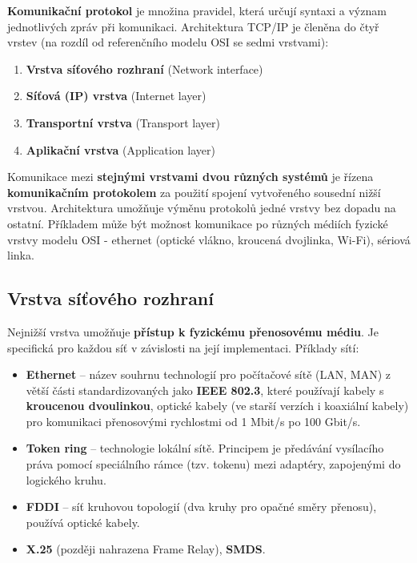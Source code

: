 \textbf{Komunikační protokol} je množina pravidel, která určují syntaxi a význam jednotlivých zpráv při komunikaci. Architektura TCP/IP je členěna do čtyř vrstev (na rozdíl od referenčního modelu OSI se sedmi vrstvami):

\begin{enumerate}
	\item \textbf{Vrstva síťového rozhraní} (Network interface)
	\item \textbf{Síťová (IP) vrstva} (Internet layer)
	\item \textbf{Transportní vrstva} (Transport layer)
	\item \textbf{Aplikační vrstva }(Application layer)
\end{enumerate}

\noindent{}

Komunikace mezi \textbf{stejnými vrstvami dvou různých systémů} je řízena \textbf{komunikačním protokolem} za použití spojení vytvořeného sousední nižší vrstvou. Architektura umožňuje výměnu protokolů jedné vrstvy bez dopadu na ostatní. Příkladem může být možnost komunikace po různých médiích fyzické vrstvy modelu OSI - ethernet (optické vlákno, kroucená dvojlinka, Wi-Fi), sériová linka.


\subsection{Vrstva síťového rozhraní}
Nejnižší vrstva umožňuje \textbf{přístup k fyzickému přenosovému médiu}. Je specifická pro každou síť v závislosti na její implementaci. Příklady sítí: 
\begin{itemize}
\item \textbf{Ethernet} --  název souhrnu technologií pro počítačové sítě (LAN, MAN) z větší části standardizovaných jako \textbf{IEEE 802.3}, které používají kabely s \textbf{kroucenou dvoulinkou}, optické kabely (ve starší verzích i koaxiální kabely) pro komunikaci přenosovými rychlostmi od 1 Mbit/s po 100 Gbit/s.
\item \textbf{Token ring} -- technologie lokální sítě. Principem je předávání vysílacího práva pomocí speciálního rámce (tzv. tokenu) mezi adaptéry, zapojenými do logického kruhu.
\item \textbf{FDDI} -- síť kruhovou topologií (dva kruhy pro opačné směry přenosu), používá optické kabely.
\item \textbf{X.25} (později nahrazena Frame Relay), \textbf{SMDS}.
\end{itemize}



